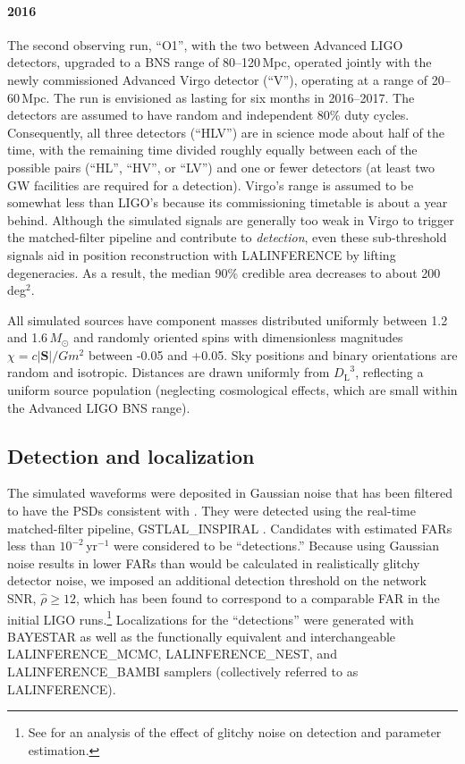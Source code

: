 \documentclass[amsmath,amssymb,aps,prx,reprint,nopreprintnumbers,nofootinbib]{revtex4-1}
\begin{document}
\paragraph*{2016} The second observing run, ``O1'', with the two between Advanced \acs{LIGO} detectors, upgraded to a \ac{BNS} range of 80\nobreakdashes--120\,Mpc, operated jointly with the newly commissioned Advanced Virgo detector (``V''), operating at a range of 20\nobreakdashes--60\,Mpc. The run is envisioned as lasting for six months in 2016\nobreakdashes--2017. The detectors are assumed to have random and independent 80\% duty cycles. Consequently, all three detectors (``HLV'') are in science mode about half of the time, with the remaining time divided roughly equally between each of the possible pairs (``HL'', ``HV'', or ``LV'') and one or fewer detectors (at least two \ac{GW} facilities are required for a detection). Virgo's range is assumed to be somewhat less than \acs{LIGO}'s because its commissioning timetable is about a year behind. Although the simulated signals are generally too weak in Virgo to trigger the matched\nobreakdashes-filter pipeline and contribute to \emph{detection}, even these sub\nobreakdashes-threshold signals aid in position reconstruction with LALINFERENCE by lifting degeneracies. As a result, the median 90\% credible area decreases to about 200\,deg$^2$.

All simulated sources have component masses distributed uniformly between 1.2 and 1.6\,$M_\odot$ and randomly oriented spins with dimensionless magnitudes $\chi = c|\mathbf{S}|/Gm^2$ between -0.05 and +0.05. Sky positions and binary orientations are random and isotropic. Distances are drawn uniformly from ${D_\mathrm{L}}^3$, reflecting a uniform source population (neglecting cosmological effects, which are small within the Advanced \acs{LIGO} \ac{BNS} range).

\subsection{Detection and localization}

The simulated waveforms were deposited in Gaussian noise that has been filtered to have the \acp{PSD} consistent with \cite{LIGOObservingScenarios}. They were detected using the real\nobreakdashes-time matched\nobreakdashes-filter pipeline, GSTLAL\_INSPIRAL \citep{Cannon:2011vi}. Candidates with estimated \acp{FAR} less than $10^{-2}$\,yr$^{-1}$ were considered to be ``detections.'' Because using Gaussian noise results in lower \acp{FAR} than would be calculated in realistically glitchy detector noise, we imposed an additional detection threshold on the network \ac{SNR}, $\hat{\rho} \geq 12$, which has been found to correspond to a comparable \ac{FAR} in the initial \ac{LIGO} runs.\footnote{See \cite{BerryLocalization} for an analysis of the effect of glitchy noise on detection and parameter estimation.} Localizations for the ``detections'' were generated with \ac{BAYESTAR} as well as the functionally equivalent and interchangeable LALINFERENCE\_MCMC, LALINFERENCE\_NEST, and LALINFERENCE\_BAMBI samplers (collectively referred to as LALINFERENCE).
\end{document}
